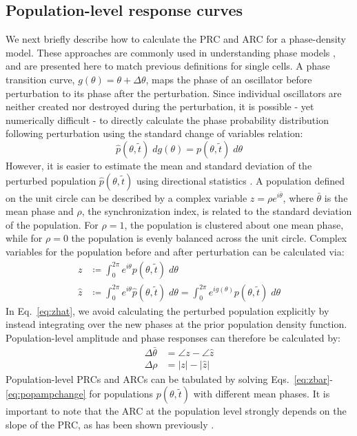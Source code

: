 \documentclass[11pt, letterpaper]{article}
\begin{document}
\subsection*{Population-level response curves}

We next briefly describe how to calculate the PRC and ARC for a phase-density
model. These approaches are commonly used in understanding phase models
\cite{Kuramoto1984, Ukai2007}, and are presented here to match previous
definitions for single cells. A phase transition curve, $g(\theta) = \theta +
\Delta\theta$, maps the phase of an oscillator before perturbation to its phase
after the perturbation. Since individual oscillators are neither created nor
destroyed during the perturbation, it is possible - yet numerically difficult -
to directly calculate the phase probability distribution following perturbation
using the standard change of variables relation:
\begin{equation}
  \hat{p}(\theta, \tilde{t})\; dg(\theta) = p(\theta, \tilde{t})\; d\theta
  \label{eq:pdfinversion}
\end{equation}
However, it is easier to estimate the mean and standard deviation of the
perturbed population $\hat{p}(\theta, \tilde{t})$ using directional statistics
\cite{Mardia2009}. A population defined on the unit circle can be described by a
complex variable $z = \rho e^{i\bar{\theta}}$, where $\bar{\theta}$ is the mean
phase and $\rho$, the synchronization index, is related to the standard
deviation of the population. For $\rho = 1$, the population is clustered about
one mean phase, while for $\rho = 0$ the population is evenly balanced across
the unit circle. Complex variables for the population before and after
perturbation can be calculated via:
\begin{align}
  z &\coloneqq \int_0^{2\pi} e^{i\theta} p(\theta, \tilde{t}) \; d\theta \label{eq:zbar}\\
  \hat{z} &\coloneqq  \int_0^{2\pi} e^{i\theta} \hat{p}(\theta, \tilde{t}) \; d\theta =
  \int_0^{2\pi} e^{i g(\theta)} p(\theta, \tilde{t}) \; d\theta
  \label{eq:zhat}
\end{align}
In Eq.~\ref{eq:zhat}, we avoid calculating the perturbed population explicitly
by instead integrating over the new phases at the prior population density
function. Population-level amplitude and phase responses can therefore be
calculated by:
\begin{align}
  \Delta \bar{\theta} &= \angle z - \angle \hat{z} \\
  \Delta \rho &= |z| - |\hat{z}|
  \label{eq:popampchange}
\end{align}
Population-level PRCs and ARCs can be tabulated by solving
Eqs.~\ref{eq:zbar}-\ref{eq:popampchange} for populations $p(\theta, \tilde{t})$
with different mean phases. It is important to note that the ARC at the
population level strongly depends on the slope of the PRC, as has been shown
previously \cite{Ukai2007}.
\end{document}
